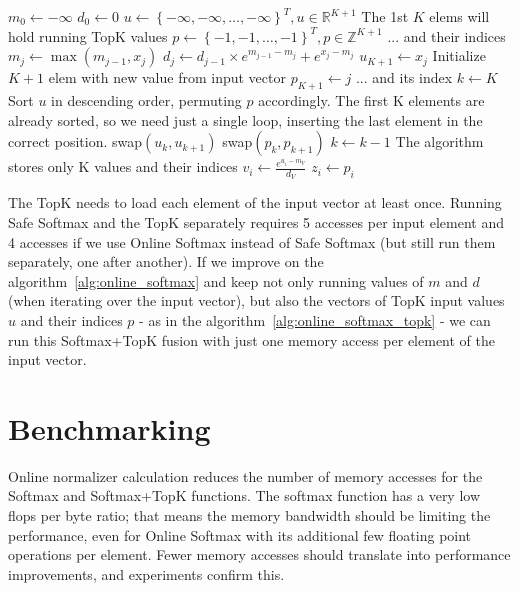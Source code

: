 \documentclass{article}
\begin{document}
\begin{algorithm}[ht]
\caption{Online softmax and top-k}
\label{alg:online_softmax_topk}
\begin{algorithmic}[1]
\State $m_0\gets -\infty$
\State $d_0\gets 0$
\State $u\gets \left\{-\infty,-\infty,\dots,-\infty\right\}^T, u\in\mathbb{R}^{K+1}$ \Comment The 1st $K$ elems will hold running TopK values
\State $p\gets \left\{-1,-1,\dots,-1\right\}^T, p\in \mathbb{Z}^{K+1}$ \Comment ... and their indices
\State $m_j\gets \max\left(m_{j-1},x_j\right)$
\State $d_j\gets d_{j-1}\times e^{m_{j-1}-m_j} +e^{x_j-m_j}$
\State $u_{K+1}\gets x_j$ \Comment Initialize $K+1$ elem with new value from input vector
\State $p_{K+1}\gets j$ \Comment ... and its index
\State $k\gets K$\label{alg:start_partial_topk_lines} \Comment Sort $u$ in descending order, permuting $p$ accordingly. The first K elements are already sorted, so we need just a single loop, inserting the last element in the correct position.
	\State swap$\left(u_k,u_{k+1}\right)$
    \State swap$\left(p_k,p_{k+1}\right)$
    \State $k\gets k-1$
\EndWhile\label{alg:end_partial_topk_lines}
\EndFor
{} \Comment The algorithm stores only K values and their indices
\State $v_i\gets \frac{e^{u_i-m_V}}{d_V}$
\State $z_i\gets p_i$
\EndFor
\end{algorithmic}
\end{algorithm}

The TopK needs to load each element of the input vector at least once. Running Safe Softmax and the TopK separately requires 5 accesses per input element and 4 accesses if we use Online Softmax instead of Safe Softmax (but still run them separately, one after another). If we improve on the algorithm~\ref{alg:online_softmax} and keep not only running values of $m$ and $d$ (when iterating over the input vector), but also the vectors of TopK input values $u$ and their indices $p$ - as in the algorithm~\ref{alg:online_softmax_topk} - we can run this Softmax+TopK fusion with just one memory access per element of the input vector.

\section{Benchmarking}
Online normalizer calculation reduces the number of memory accesses for the Softmax and Softmax+TopK functions. The softmax function has a very low flops per byte ratio; that means the memory bandwidth should be limiting the performance, even for Online Softmax with its additional few floating point operations per element. Fewer memory accesses should translate into performance improvements, and experiments confirm this.
\end{document}
